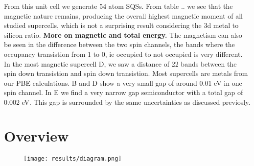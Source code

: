 From this unit cell we generate 54 atom SQSs. From table .. we see that the magnetic nature remains, producing the overall highest magnetic moment of all studied supercells, which is not a surprising result considering the 3d metal to silicon ratio. \textbf{More on magnetic and total energy.} The magnetism can also be seen in the difference between the two spin channels, the bands where the occupancy transistion from 1 to 0, ie occupied to not occupied is very different. In the most magnetic supercell D, we saw a distance of 22 bands between the spin down transistion and spin down transistion. Most supercells are metals from our PBE calculations. B and D show a very small gap of around 0.01 eV in one spin channel.  In E we find a very narrow gap semiconductor with a total gap of 0.002 eV. This gap is surrounded by the same uncertainties as discussed previosly.  

\section{Overview}

\begin{figure}[H]
\centering
\texttt{[image: results/diagram.png]}
\end{figure}
